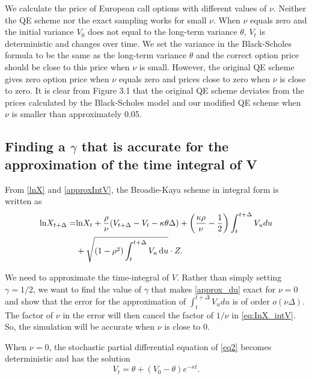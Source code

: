 \documentclass{ws-ijfe}
\begin{document}
We calculate the price of European call options with different values of $\nu$. Neither the QE scheme nor the exact sampling works for small $\nu$. When $\nu$ equals zero and the initial variance $V_0$ does not equal to the long-term variance $\theta$, $V_t$ is deterministic and changes over time. We set the variance in the Black-Scholes formula to be the same as the long-term variance $\theta$ and the correct option price should be close to this price when $\nu$ is small. However, the original QE scheme gives zero option price when $\nu$ equals zero and prices close to zero when $\nu$ is close to zero. It is clear from Figure 3.1 that the original QE scheme deviates from the prices calculated by the Black-Scholes model and our modified QE scheme when $\nu$ is smaller than approximately 0.05.

\subsection{Finding a $\gamma$ that is accurate for the approximation of the time integral of V}\label{se:findGamma}

From \eqref{lnX} and \eqref{approxIntV}, the Broadie-Kaya scheme in integral form is written as
\begin{equation}\label{eq:InX_intV}
\begin{split}
    \text{ln}X_{t+\Delta}=&\text{ln}X_t+\frac{\rho}{\nu}(V_{t+\Delta}-V_t-\kappa\theta\Delta)+\bigg(\frac{\kappa\rho}{\nu}-\frac{1}{2}\bigg)\int_{t}^{t+\Delta} V_u du\\
    &+\sqrt{(1-\rho^2)\int_{t}^{t+\Delta}V_u\,\d u}\cdot Z.
\end{split}
\end{equation}

We need to approximate the time-integral of $V$. Rather than simply setting $\gamma=1/2$, we want to find the value of $\gamma$ that makes \eqref{approx_du} exact for $\nu=0$ and show that the error for the approximation of  $\int_{t}^{t+\Delta} V_u du$ is of order $o(\nu\Delta)$. The factor of $\nu$ in the error will then cancel the factor of $1/\nu$ in \eqref{eq:InX_intV}. So, the simulation will be accurate when $\nu$ is close to $0$.

When $\nu=0$, the stochastic partial differential equation of \eqref{eq2} becomes deterministic and has the solution
\begin{equation}\label{V nu=0}
  V_t=\theta + (V_0-\theta)e^{-\kappa t}.
\end{equation}
\end{document}
